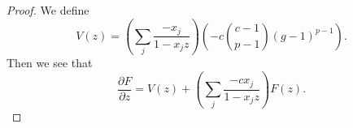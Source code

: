 \documentclass{article}
\numberwithin{equation}{section}
\begin{document}
\begin{proof}
%
%

We define $$V(z)=\left(\sum_j \frac{-x_j}{1-x_jz}\right)\left(-c\binom{c-1}{p-1}(g-1)^{p-1}\right).$$ Then we see that $$\frac{\partial F}{\partial z}=V(z)+\left(\sum_j \frac{-cx_j}{1-x_jz}\right)F(z).$$


\end{proof}
\end{document}

